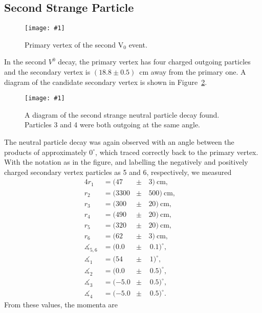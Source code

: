 \documentclass[twocolumn]{article}
\newcommand{\insertFigure}[1]{%
   \texttt{[image: \#1]}%
}
\begin{document}
\subsection{Second Strange Particle}
\begin{figure}
\centering
\insertFigure{Images/V0second1}
\caption{Primary vertex of the second V$_0$ event.}
\label{fig:V0second1}
\end{figure}
In the second $V^0$ decay, the primary vertex has four charged outgoing particles and the secondary vertex is $(18.8 \pm 0.5)$~cm away from the primary one. A diagram of the candidate secondary vertex is shown in Figure~\ref{fig:primary2}. 
\begin{figure} [!h]
	\insertFigure{Images/primary_2.png}
	\caption{A diagram of the second strange neutral particle decay found. Particles 3 and 4 were both outgoing at the same angle.}
	\label{fig:primary2}
\end{figure}
The neutral particle decay was again observed with an angle between the products of approximately $0^\circ$, which traced correctly back to the primary vertex. With the notation as in the figure, and labelling the negatively and positively charged secondary vertex particles as 5 and 6, respectively, we measured
\begin{alignat*}{4}
	r_1 &= (47 &\pm \, &3)~\text{cm},\\
	r_2 &= (3300 &\pm \, &500)~\text{cm},\\
	r_3 &= (300 &\pm \, &20)~\text{cm},\\
	r_4 &= (490 &\pm \, &20)~\text{cm},\\
	r_5 &= (320 &\pm \, &20)~\text{cm},\\
	r_6 &= (62&\pm \, &3)~\text{cm},\\
	\measuredangle_{5,6} &= (0.0 &\pm & \, 0.1)^{\circ},&\\
	\measuredangle_{1} &= (54 &\pm & \, 1)^{\circ},&\\
	\measuredangle_{2} &= (0.0 &\pm & \, 0.5)^{\circ},&\\
	\measuredangle_{3} &= (-5.0 &\pm & \, 0.5)^{\circ},&\\
	\measuredangle_{4} &= (-5.0 &\pm & \, 0.5)^{\circ}.&
\end{alignat*} 
From these values, the momenta are
\end{document}
